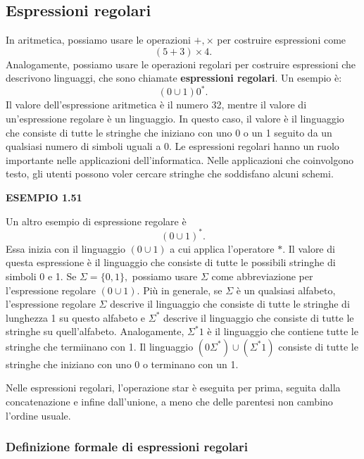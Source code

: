 \documentclass{article}
\begin{document}
\subsection{Espressioni regolari}

In aritmetica, possiamo usare le operazioni $+,\times$ per costruire espressioni come
$$(5+3)\times4.$$
Analogamente, possiamo usare le operazioni regolari per costruire espressioni che descrivono linguaggi, che sono chiamate \textbf{espressioni regolari}.
Un esempio è:
$$(0\cup 1)0^{*}.$$
Il valore dell'espressione aritmetica è il numero 32, mentre il valore di un'espressione regolare è un linguaggio. In questo caso, il valore è il linguaggio che consiste di tutte le stringhe che iniziano con uno 0 o un 1 seguito da un qualsiasi numero di simboli uguali a 0.
Le espressioni regolari hanno un ruolo importante nelle applicazioni dell'informatica. Nelle applicazioni che coinvolgono testo, gli utenti possono voler cercare stringhe che soddisfano alcuni schemi.
\vspace{3em}

\textbf{ESEMPIO 1.51}

Un altro esempio di espressione regolare è $$(0 \cup 1)^{*}.
$$ Essa inizia con il linguaggio $(0 \cup 1)$ a cui applica l'operatore $*$. Il valore di questa espressione è il linguaggio che consiste di tutte le possibili stringhe di simboli 0 e 1. Se $\Sigma = \{0,1\},$ possiamo usare $\Sigma$ come abbreviazione per l'espressione regolare $(0\cup 1)$. Più in generale, se $\Sigma$ è un qualsiasi alfabeto, l'espressione regolare $\Sigma$ descrive il linguaggio che consiste di tutte le stringhe di lunghezza 1 su questo alfabeto e $\Sigma^*$ descrive il linguaggio che consiste di tutte le stringhe su quell'alfabeto. Analogamente, $\Sigma^{*}1$ è il linguaggio che contiene tutte le stringhe che termiinano con 1. Il linguaggio $(0\Sigma^{*}) \cup (\Sigma^{*}1)$ consiste di tutte le stringhe che iniziano con uno 0 o terminano con un 1.

\begin{tcolorbox}[colback=red!10!white, colframe=red!50!black, title=IMPORTANTE!]
    Nelle espressioni regolari, l'operazione star è eseguita per prima,
    seguita dalla concatenazione e infine dall'unione, a meno che delle parentesi
    non cambino l'ordine usuale.
\end{tcolorbox}

\subsubsection{Definizione formale di espressioni regolari}
\end{document}
